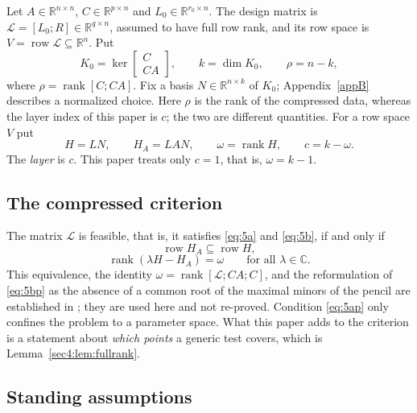 \documentclass[journal]{IEEEtran}
\theoremstyle{plainn}
\theoremstyle{remark}
\newcommand{\row}{\operatorname{row}}
\newcommand{\rank}{\operatorname{rank}}
\begin{document}
Let $A\in\mathbb R^{n\times n}$, $C\in\mathbb R^{p\times n}$ and $L_0\in\mathbb R^{r_0\times n}$. The
design matrix is $\mathcal L=[L_0;R]\in\mathbb R^{q\times n}$, assumed to have full row rank, and its
row space is $V=\row\mathcal L\subseteq\mathbb R^n$. Put
\begin{equation}
  \label{eq:K0}
  K_0=\ker\left[\begin{smallmatrix}C\\ CA\end{smallmatrix}\right],\qquad
  k=\dim K_0,\qquad
  \rho=n-k,
\end{equation}
where $\rho=\rank[C;CA]$. Fix a basis $N\in\mathbb R^{n\times k}$ of $K_0$; Appendix~\ref{appB}
describes a normalized
choice. Here $\rho$ is the rank of the compressed data, whereas the layer index of this paper is $c$;
the two are different quantities. For a row space $V$ put
\begin{equation}
  \label{eq:compressed-data}
  H=LN,\qquad H_A=LAN,\qquad \omega=\rank H,\qquad c=k-\omega .
\end{equation}
The \emph{layer} is $c$. This paper treats only $c=1$, that is, $\omega=k-1$.

\subsection{The compressed criterion}
\label{sec:prelim:criterion}

The matrix $\mathcal L$ is feasible, that is, it satisfies \eqref{eq:5a} and \eqref{eq:5b}, if and only
if
\begin{equation}
  \label{eq:5ap}
  \row H_A\subseteq\row H,
\end{equation}
\begin{equation}
  \label{eq:5bp}
  \rank(\lambda H-H_A)=\omega\qquad\text{for all }\lambda\in\mathbb C .
\end{equation}
This equivalence, the identity $\omega=\rank[\mathcal L;CA;C]$, and the reformulation of
\eqref{eq:5bp} as the absence of a common root of the maximal minors of the pencil are established in
\cite{companion1}; they are used here and not re-proved. Condition \eqref{eq:5ap} only confines the
problem to a parameter space. What this paper adds to the criterion is a statement about \emph{which
points} a generic test covers, which is Lemma~\ref{sec4:lem:fullrank}.

\subsection{Standing assumptions}
\label{sec:prelim:assumptions}
\end{document}

